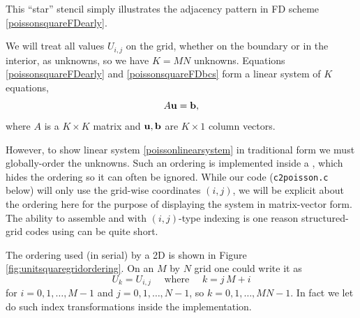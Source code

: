 \begin{marginfigure}
\caption{This ``star'' stencil simply illustrates the adjacency pattern in FD scheme \eqref{poissonsquareFDearly}.}
\label{fig:unitsquaregridstencil}
\end{marginfigure}

We will treat all values $U_{i,j}$ on the grid, whether on the boundary or in the interior, as unknowns, so we have $K=MN$ unknowns.  Equations \eqref{poissonsquareFDearly} and \eqref{poissonsquareFDbcs} form a linear system of $K$ equations,
\begin{equation}
A \mathbf{u} = \mathbf{b}, \label{poissonlinearsystem}
\end{equation}
where $A$ is a $K\times K$ matrix and $\mathbf{u},\mathbf{b}$ are $K\times 1$ column vectors.

However, to show linear system \eqref{poissonlinearsystem} in traditional form we must globally-order the unknowns.  Such an ordering is implemented inside a \PETSc \pDMDA, which hides the ordering so it can often be ignored.  While our code (\texttt{c2poisson.c} below) will only use the grid-wise coordinates $(i,j)$, we will be explicit about the ordering here for the purpose of displaying the system in matrix-vector form.  The ability to assemble \pMats and \pVecs with $(i,j)$-type indexing is one reason structured-grid codes using \pDMDA can be quite short.

The ordering used (in serial) by a 2D \pDMDA is shown in Figure \ref{fig:unitsquaregridordering}.  On an $M$ by $N$ grid one could write it as
\begin{equation}
    U_k = U_{i,j} \quad \text{ where } \quad k = j\,M + i \label{orderingfd}
\end{equation}
for $i=0,1,\dots,M-1$ and $j=0,1,\dots,N-1$, so $k=0,1,\dots,MN-1$.  In fact we let \PETSc do such index transformations inside the \pDMDA implementation.

